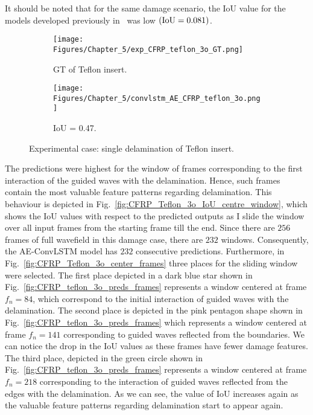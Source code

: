 It should be noted that for the same damage scenario, the IoU value for the models developed previously in~\cite{Ijjeh2021} was low \((\textup{IoU}=0.081)\).
\begin{figure} [!h]
	\centering
	\begin{subfigure}[b]{0.47\textwidth}
		\centering
		\texttt{[image: Figures/Chapter\_5/exp\_CFRP\_teflon\_3o\_GT.png]}
		\caption{GT of Teflon insert.}
		\label{fig:exp_CFRP_teflon_3o_GT}
	\end{subfigure}
	\begin{subfigure}[b]{0.47\textwidth}
		\centering
		\texttt{[image: Figures/Chapter\_5/convlstm\_AE\_CFRP\_teflon\_3o.png]}
		\caption{IoU = 0.47.}
		\label{fig:convlstm_AE_CFRP_teflon_3o}
	\end{subfigure}
	\caption{Experimental case: single delamination of Teflon insert.}
	\label{fig:exp_Teflon_insert}
\end{figure} 

The predictions were highest for the window of frames corresponding to the first interaction of the guided waves with the delamination.
Hence, such frames contain the most valuable feature patterns regarding delamination. 
This behaviour is depicted in Fig.~\ref{fig:CFRP_Teflon_3o_IoU_centre_window}, which shows the IoU values with respect to the predicted outputs as I slide the window over all input frames from the starting frame till the end.
Since there are \(256\) frames of full wavefield in this damage case, there are \(232\) windows.
Consequently, the AE-ConvLSTM model has \(232\) consecutive predictions.
Furthermore, in Fig.~\ref{fig:CFRP_Teflon_3o_center_frames} three places for the sliding window were selected. 
The first place depicted in a dark blue star shown in Fig.~\ref{fig:CFRP_teflon_3o_preds_frames} represents a window centered at frame \(f_n=84\), which correspond to the initial interaction of guided waves with the delamination.
The second place is depicted in the pink pentagon shape shown in Fig.~\ref{fig:CFRP_teflon_3o_preds_frames} which represents a window centered at frame \(f_n=141\) corresponding to guided waves reflected from the boundaries.
We can notice the drop in the IoU values as these frames have fewer damage features.
The third place, depicted in the green circle shown in Fig.~\ref{fig:CFRP_teflon_3o_preds_frames} represents a window centered at frame \(f_n=218\) corresponding to the interaction of guided waves reflected from the edges with the delamination.
As we can see, the value of IoU increases again as the valuable feature patterns regarding delamination start to appear again.

